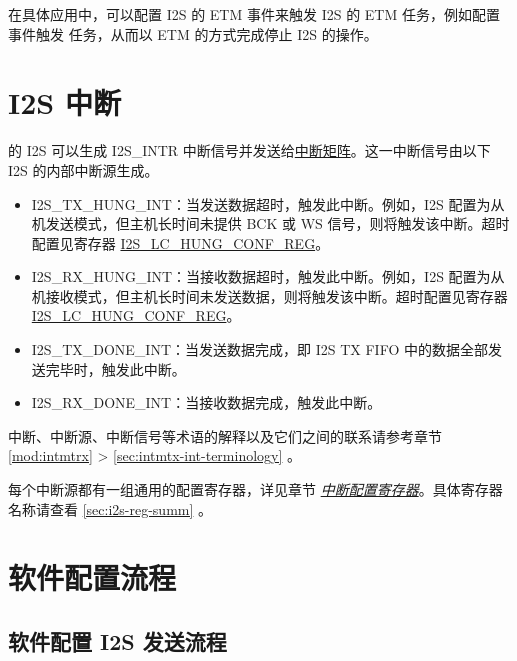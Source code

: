 \documentclass[main\_\_CN.tex]{subfiles}
\begin{document}
在具体应用中，可以配置 I2S 的 ETM 事件来触发 I2S 的 ETM 任务，例如配置  事件触发  任务，从而以 ETM 的方式完成停止 I2S 的操作。

\section{I2S 中断} \label{sec:i2s-interrupts}

\chipname{} 的 I2S 可以生成 I2S\_INTR 中断信号并发送给\hyperref[mod:intmtrx]{中断矩阵}。这一中断信号由以下 I2S 的内部中断源生成。

\begin{itemize}
\item \label{int:I2STXHUNGINT}I2S\_TX\_HUNG\_INT：当发送数据超时，触发此中断。例如，I2S 配置为从机发送模式，但主机长时间未提供 BCK 或 WS 信号，则将触发该中断。超时配置见寄存器 \hyperref[regdesc:I2SLCHUNGCONFREG]{I2S\_LC\_HUNG\_CONF\_REG}。
\item \label{int:I2SRXHUNGINT}I2S\_RX\_HUNG\_INT：当接收数据超时，触发此中断。例如，I2S 配置为从机接收模式，但主机长时间未发送数据，则将触发该中断。超时配置见寄存器 \hyperref[regdesc:I2SLCHUNGCONFREG]{I2S\_LC\_HUNG\_CONF\_REG}。
\item \label{int:I2STXDONEINT}I2S\_TX\_DONE\_INT：当发送数据完成，即 I2S TX FIFO 中的数据全部发送完毕时，触发此中断。
\item \label{int:I2SRXDONEINT}I2S\_RX\_DONE\_INT：当接收数据完成，触发此中断。
\end{itemize}

\begin{tiplisting}
中断、中断源、中断信号等术语的解释以及它们之间的联系请参考章节 \ref{mod:intmtrx} \textit{} > \ref{sec:intmtx-int-terminology} \textit{}。
\end{tiplisting}

每个中断源都有一组通用的配置寄存器，详见章节 \hyperref[interrupt-config-registers]{\textit{中断配置寄存器}}。具体寄存器名称请查看 \ref{sec:i2s-reg-summ} \textit{}。

\section{软件配置流程}
\subsection{软件配置 I2S 发送流程}\label{sec:i2s-configure-i2s-tx-mode}
\end{document}
